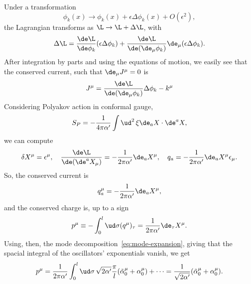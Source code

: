 \begin{mdframed}
\begin{innerproof}
    Under a transformation
    \begin{equation}
        \phi_k(x) \to \phi_k(x) + \epsilon \Delta\phi_k(x) + O(\epsilon^2),
    \end{equation}
    the Lagrangian transforms as $\L \to \L + \Delta \L$, with
    \begin{equation}
        \Delta \L = \frac{\de \L}{\de \phi_k} (\epsilon \Delta \phi_k) + \frac{\de \L}{\de(\de_\mu \phi_k)} \de_\mu (\epsilon \Delta \phi_k) .
    \end{equation}
    After integration by parts and using the equations of motion, we easily see that the conserved current, such that $\de_\mu J^\mu = 0$ is
    \begin{equation}
        J^\mu = \frac{\de \L}{\de(\de_\mu \phi_k)} \Delta \phi_k - k^\mu
    \end{equation}
    Considering Polyakov action in conformal gauge, 
    \begin{equation}
    S_P = -\frac{1}{4\pi\alpha'}\int \ud^2 \, \xi \de_a X\cdot \de^a X,
    \end{equation}
    we can compute
    \begin{equation*}
        \delta X^\mu = \epsilon^\mu, \quad \frac{\de \L}{\de(\de^a X_\mu)} = - \frac{1}{2\pi\alpha'} \de_a X^\mu, \quad q_a = -\frac{1}{2\pi\alpha'} \de_a X^\mu \epsilon_\mu.
    \end{equation*}
    So, the conserved current is
    \begin{equation}
        q^\mu_a = - \frac{1}{2\pi\alpha'} \de_a X^\mu,
    \end{equation}
    and the conserved charge is, up to a sign
    \begin{equation}
        p^\mu \equiv  -\int_0^l \ud \sigma (q^\mu)_\tau = \frac{1}{2\pi\alpha'} \de_\tau X^\mu.
    \end{equation}
    Using, then, the mode decomposition~\eqref{eq:mode-expansion}, giving that the spacial integral of the oscillators' exponentials vanish, we get
    \begin{equation}
        p^\mu = \frac{1}{2\pi\alpha'} \int_0^l \ud \sigma \, \sqrt{2\alpha'} \frac{\pi}{l} (\tilde{\alpha}^\mu_0 + \alpha^\mu_0) + \dots = \frac{1}{\sqrt{2\alpha'}} (\tilde{\alpha}^\mu_0 + \alpha^\mu_0).
    \end{equation}
\end{innerproof}
\end{mdframed}


